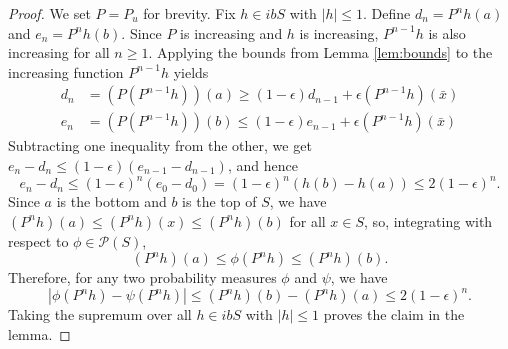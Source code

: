 \documentclass[12pt,reqno]{amsart}
\numberwithin{equation}{section}
\theoremstyle{definition}
\newcommand{\1}{\mathbbm{1}}
\newcommand{\pP}{\mathscr{P}}
\begin{document}
\begin{proof}
    We set $P = P_u$ for brevity.
    Fix $h \in ibS$ with $|h| \leq 1$. Define $d_n = P^n h(a)$ and $e_n = P^n h(b)$.
    Since $P$ is increasing and $h$ is increasing, $P^{n-1}h$ is also increasing for all $n \geq 1$.
    Applying the bounds from Lemma \ref{lem:bounds} to the increasing function
    $P^{n-1}h$ yields
    \begin{align*}
        d_n &= (P (P^{n-1}h)) (a) \geq (1-\epsilon)d_{n-1} +
            \epsilon (P^{n-1}h)(\bar{x}) \\
        e_n &= (P( P^{n-1}h))(b) \leq (1-\epsilon)e_{n-1} + \epsilon (P^{n-1}h)(\bar{x})
    \end{align*}
    Subtracting one inequality from the other, we get $e_n - d_n \leq
    (1-\epsilon)(e_{n-1} - d_{n-1})$, and hence
    \begin{equation}
        e_n - d_n \leq (1-\epsilon)^n(e_0 - d_0) =
        (1-\epsilon)^n(h(b) - h(a)) \leq 2(1-\epsilon)^n.
    \end{equation}
    Since $a$ is the bottom and $b$ is the top of $S$, we have $(P^n h)(a) \leq
    (P^n h)(x) \leq (P^n h)(b)$ for all $x \in S$, so, integrating with respect
    to $\phi \in \pP(S)$,
    \begin{equation*}
        (P^n h)(a) \leq \phi (P^n h) \leq (P^n h)(b).
    \end{equation*}
    Therefore, for any two probability measures $\phi$ and $\psi$, we have
    \begin{equation*}
        |\phi (P^n h) - \psi (P^n h) | \leq (P^n h)(b) - (P^n h)(a) \leq 2(1-\epsilon)^n.
    \end{equation*}
    Taking the supremum over all $h \in ibS$ with $|h| \leq 1$ proves the claim in the lemma.
\end{proof}
\end{document}
